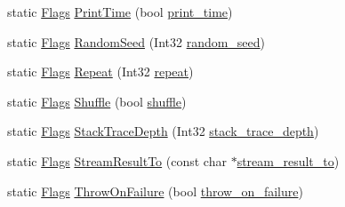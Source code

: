 \begin{DoxyCompactItemize}
\item 
static \mbox{\hyperlink{structtesting_1_1_flags}{Flags}} \mbox{\hyperlink{structtesting_1_1_flags_af4dc8454995fb3691399a049e95de179}{Print\+Time}} (bool \mbox{\hyperlink{structtesting_1_1_flags_a8758d574ce5513402679df258f788733}{print\+\_\+time}})
\item 
static \mbox{\hyperlink{structtesting_1_1_flags}{Flags}} \mbox{\hyperlink{structtesting_1_1_flags_a695cd8b8ab44df5eaa371bacded78c05}{Random\+Seed}} (Int32 \mbox{\hyperlink{structtesting_1_1_flags_a4728bce63433f711205fd7b427e57f1b}{random\+\_\+seed}})
\item 
static \mbox{\hyperlink{structtesting_1_1_flags}{Flags}} \mbox{\hyperlink{structtesting_1_1_flags_a19d47e87d77a18ef4fa8a85b74e25956}{Repeat}} (Int32 \mbox{\hyperlink{structtesting_1_1_flags_a61614dd07f97f6e04d27c004ff15195e}{repeat}})
\item 
static \mbox{\hyperlink{structtesting_1_1_flags}{Flags}} \mbox{\hyperlink{structtesting_1_1_flags_a19ddbbaed61bda44a1940333b7c5a469}{Shuffle}} (bool \mbox{\hyperlink{structtesting_1_1_flags_a51c689e47e0f55c16116ac2a1d3b05d6}{shuffle}})
\item 
static \mbox{\hyperlink{structtesting_1_1_flags}{Flags}} \mbox{\hyperlink{structtesting_1_1_flags_a16b01d8bcceaa9fa8211fd24faa75b5a}{Stack\+Trace\+Depth}} (Int32 \mbox{\hyperlink{structtesting_1_1_flags_a20c6592453909c1adace64bf6a2bc2de}{stack\+\_\+trace\+\_\+depth}})
\item 
static \mbox{\hyperlink{structtesting_1_1_flags}{Flags}} \mbox{\hyperlink{structtesting_1_1_flags_a9cf0f64310b28eadbbfbb35584ebfc71}{Stream\+Result\+To}} (const char $\ast$\mbox{\hyperlink{structtesting_1_1_flags_a2adb495720379293f7e3fa0148482ac9}{stream\+\_\+result\+\_\+to}})
\item 
static \mbox{\hyperlink{structtesting_1_1_flags}{Flags}} \mbox{\hyperlink{structtesting_1_1_flags_ad856df862414ed0dadf80b5e03829cc7}{Throw\+On\+Failure}} (bool \mbox{\hyperlink{structtesting_1_1_flags_ab8e7d21e31e641efe47b8050759e001a}{throw\+\_\+on\+\_\+failure}})
\end{DoxyCompactItemize}
